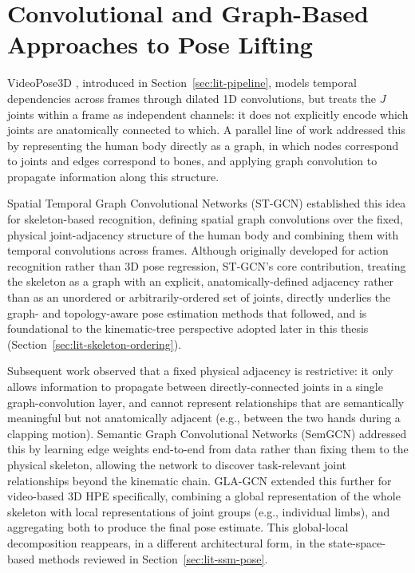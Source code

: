 \section{Convolutional and Graph-Based Approaches to Pose Lifting}
\label{sec:lit-conv-graph}

VideoPose3D \cite{pavllo2019videopose3d}, introduced in
Section~\ref{sec:lit-pipeline}, models temporal dependencies across frames
through dilated 1D convolutions, but treats the $J$ joints within a frame
as independent channels: it does not explicitly encode which joints are
anatomically connected to which. A parallel line of work addressed this by
representing the human body directly as a graph, in which nodes correspond
to joints and edges correspond to bones, and applying graph convolution to
propagate information along this structure.

Spatial Temporal Graph Convolutional Networks (ST-GCN) \cite{yan2018stgcn}
established this idea for skeleton-based recognition, defining spatial
graph convolutions over the fixed, physical joint-adjacency structure of
the human body and combining them with temporal convolutions across
frames. Although originally developed for action recognition rather than
3D pose regression, ST-GCN's core contribution, treating the skeleton
as a graph with an explicit, anatomically-defined adjacency rather than
as an unordered or arbitrarily-ordered set of joints, directly
underlies the graph- and topology-aware pose estimation methods that
followed, and is foundational to the kinematic-tree perspective adopted
later in this thesis (Section~\ref{sec:lit-skeleton-ordering}).

Subsequent work observed that a fixed physical adjacency is restrictive:
it only allows information to propagate between directly-connected joints
in a single graph-convolution layer, and cannot represent relationships
that are semantically meaningful but not anatomically adjacent (e.g.,
between the two hands during a clapping motion). Semantic Graph
Convolutional Networks (SemGCN) \cite{zhao2019semgcn} addressed this by
learning edge weights end-to-end from data rather than fixing them to the
physical skeleton, allowing the network to discover task-relevant joint
relationships beyond the kinematic chain. GLA-GCN \cite{yu2023glagcn}
extended this further for video-based 3D HPE specifically, combining a
global representation of the whole skeleton with local representations of
joint groups (e.g., individual limbs), and aggregating both to produce the
final pose estimate. This global-local decomposition reappears, in a
different architectural form, in the state-space-based methods reviewed in
Section~\ref{sec:lit-ssm-pose}.

